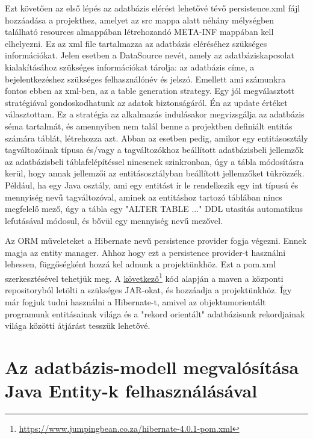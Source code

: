 \documentclass[centeredchapter]{thesis-ekf}
\theoremstyle{definition}
\theoremstyle{remark}
\begin{document}
Ezt követően az első lépés az adatbázis elérést lehetővé tévő persistence.xml fájl hozzáadása a projekthez, amelyet az src mappa alatt néhány mélységben található resources almappában létrehozandó META-INF mappában kell elhelyezni. Ez az xml file tartalmazza az adatbázis eléréséhez szükséges információkat. Jelen esetben a DataSource nevét, amely az adatbáziskapcsolat kialakításához szükséges információkat tárolja: az adatbázis címe, a bejelentkezéshez szükséges felhasználónév és jelszó.
Emellett ami számunkra fontos ebben az xml-ben, az a table generation strategy. Egy jól megválasztott stratégiával gondoskodhatunk az adatok biztonságáról. Én az update értéket választottam. Ez a stratégia az alkalmazás indulásakor megvizsgálja az adatbázis séma tartalmát, és amennyiben nem talál benne a projektben definiált entitás számára táblát, létrehozza azt. Abban az esetben pedig, amikor egy entitásosztály tagváltozóinak típusa és/vagy a tagváltozókhoz beállított adatbázisbeli jellemzők az adatbázisbeli táblafelépítéssel nincsenek szinkronban, úgy a tábla módosításra kerül, hogy annak jellemzői az entitásosztályban beállított jellemzőket tükrözzék.
Például, ha egy Java osztály, ami egy entitást ír le rendelkezik egy int típusú és mennyiség nevű tagváltozóval, aminek az entitáshoz tartozó táblában nincs megfelelő mező, úgy a tábla egy "ALTER TABLE ..." DDL utasítás automatikus lefutásával módosul, és bővül egy mennyiség nevű mezővel. 

Az ORM műveleteket a Hibernate nevű persistence provider fogja végezni. Ennek magja az entity manager. Ahhoz hogy ezt a persistence provider-t használni lehessen, függőségként hozzá kel adnunk a projektünkhöz. Ezt a pom.xml szerkesztésével tehetjük meg. A \hyperlink{figure-hibarnate-dependencies}{következő}\footnote{\url{https://www.jumpingbean.co.za/hibernate-4.0.1-pom.xml}} kód alapján a maven a központi repositoryból letölti a szükséges JAR-okat, és hozzáadja a projektünkhöz. Így már fogjuk tudni használni a Hibernate-t, amivel az objektumorientált programunk entitásainak világa és a "rekord orientált" adatbázisunk rekordjainak világa közötti átjárást tesszük lehetővé.

\newpage
\hypertarget{figure-hibarnate-dependencies}{}




\newpage
\section{Az adatbázis-modell megvalósítása Java Entity-k felhasználásával}
\end{document}

